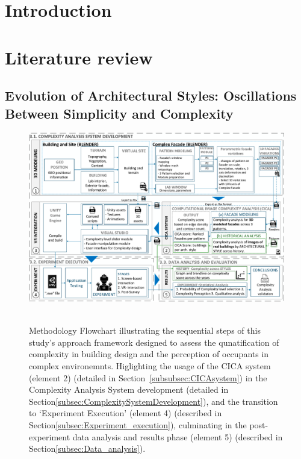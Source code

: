 %


\begin{linenumbers}

\section{Introduction}
\label{sec:1Introduction}



\section{Literature review}
\label{sec:LiteratureReview}





\subsection{Evolution of Architectural Styles: Oscillations Between Simplicity and Complexity}
\label{subsec:TimelineArchitectureStyles}


    \begin{figure}[!htb]
        \centering
        \includegraphics[width=\linewidth]{Images/MethodologyFlowchart}~\caption{Methodology Flowchart illustrating the sequential steps of this study's approach framework designed to assess the qunatification of complexity in building design and the perception of occupants in complex environemnts. Higlighting the usage of the CICA system (element 2) (detailed in Section~\ref{subsubsec:CICAsystem}) in the Complexity Analysis System development (detailed in Section\ref{subsec:ComplexitySystemDevelopment}), and the transition to `Experiment Execution' (element 4) (described in Section\ref{subsec:Experiment_execution}), culminating in the post-experiment data analysis and results phase (element 5) (described in Section\ref{subsec:Data_analysis}).}
          \label{fig:MethodologyFlowchartComplexity}
    \end{figure}


\end{linenumbers}
